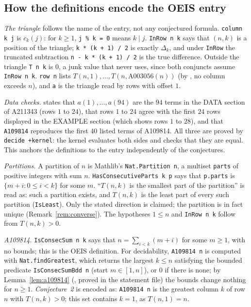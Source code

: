 \documentclass[11pt]{amsart}
\theoremstyle{plain}
\theoremstyle{definition}
\begin{document}
\subsection*{How the definitions encode the OEIS entry}
\emph{The triangle} follows the name of the entry, not any conjectured formula. \texttt{column k j} is $c_k(j)$: for $k\ge1$, \texttt{j \% k = 0} means $k\mid j$. \texttt{InRow n k} says that $(n,k)$ is a position of the triangle; \texttt{k * (k + 1) / 2} is exactly $\Delta_k$, and under \texttt{InRow} the truncated subtraction \texttt{n - k * (k + 1) / 2} is the true difference. Outside the triangle \texttt{T n k} is $0$, a junk value that  never uses, since both conjuncts assume \texttt{InRow n k}. \texttt{row n} lists $T(n,1),\dots,T(n,\text{A003056}(n))$ (by , no column exceeds $n$), and \texttt{a} is the triangle read by rows with offset $1$.

\emph{Data checks.}  states that $a(1),\dots,a(94)$ are the $94$ terms in the DATA section of A211343 (rows $1$ to $24$),  that rows $1$ to $24$ agree with the first $24$ rows displayed in the EXAMPLE section (which shows rows $1$ to $28$), and  that \texttt{A109814} reproduces the first $40$ listed terms of A109814. All three are proved by \texttt{decide +kernel}: the kernel evaluates both sides and checks that they are equal. This anchors the definitions to the entry independently of the conjectures.

\emph{Partitions.} A partition of $n$ is Mathlib's \texttt{Nat.Partition n}, a multiset \texttt{parts} of positive integers with sum $n$. \texttt{HasConsecutiveParts k p} says that \texttt{p.parts} is $\{m+i: 0\le i<k\}$ for some $m$. ``$T(n,k)$ is the smallest part of the partition'' is read as: such a partition exists, and $T(n,k)$ is the least part of every such partition (\texttt{IsLeast}). Only the stated direction is claimed; the partition is in fact unique (Remark~\ref{rem:converse}). The hypotheses $1\le n$ and \texttt{InRow n k} follow from $T(n,k)>0$.

\emph{A109814.} \texttt{IsConsecSum n k} says that $n=\sum_{i<k}(m+i)$ for some $m\ge1$, with no bounds; this is the OEIS definition. For decidability, \texttt{A109814 n} is computed with \texttt{Nat.findGreatest}, which returns the largest $k\le n$ satisfying the bounded predicate \texttt{IsConsecSumBdd n} (start $m\in[1,n]$), or $0$ if there is none; by Lemma~\ref{lem:a109814} (, proved in the statement file) the bounds change nothing for $n\ge1$. \emph{Conjecture~2} is encoded as: \texttt{A109814 n} is the greatest column $k$ of row $n$ with $T(n,k)>0$; this set contains $k=1$, as $T(n,1)=n$.
\end{document}
